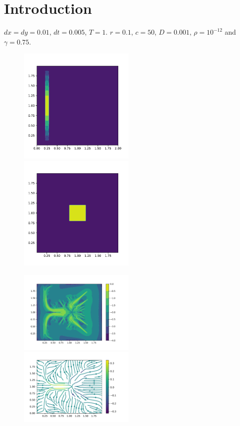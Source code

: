 \documentclass{article}
\theoremstyle{plain}
\theoremstyle{remark}
\theoremstyle{remark}
\theoremstyle{remark}
\numberwithin{equation}{section}
\begin{document}
\section{Introduction}
$dx = dy = 0.01$, $dt = 0.005$, $T = 1$. $r = 0.1$, $c = 50$, $D = 0.001$, $\rho = 10^{-12}$ and $\gamma = 0.75$.
\begin{figure}
  \includegraphics[width=0.5\textwidth]{1/m1}
  \includegraphics[width=0.5\textwidth]{1/s}
\end{figure}
\begin{figure}
  \includegraphics[width=0.5\textwidth]{1/PCG}
  \includegraphics[width=0.5\textwidth]{1/vector}
\end{figure}
\end{document}
